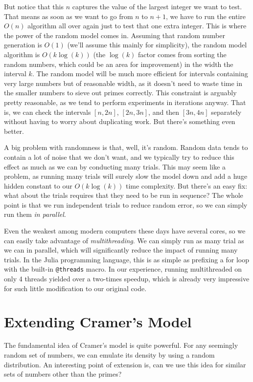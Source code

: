 \documentclass[conference]{IEEEtran}
\begin{document}
But notice that this $n$ captures the value of the largest
integer we want to test. That means as soon as we want
to go from $n$ to $n + 1$, we have to run the entire
$O(n)$ algorithm all over again just to test that one
extra integer. This is where the power of the random
model comes in. Assuming that random number generation
is $O(1)$ (we'll assume this mainly for simplicity),
the random model algorithm is $O(k \log(k))$ (the
$\log(k)$ factor comes from sorting the random numbers,
which could be an area for improvement) in the
width the interval $k$. The random model will be much
more efficient for intervals containing very large
numbers but of reasonable width, as it doesn't need to
waste time in the smaller numbers to sieve out primes
correctly. This constraint is arguably pretty reasonable,
as we tend to perform experiments in iterations anyway.
That is, we can check the intervals $[n, 2n]$, $[2n, 3n]$,
and then $[3n, 4n]$ separately without having to worry
about duplicating work. But there's something even better.

A big problem with randomness is that, well, it's random.
Random data tends to contain a lot of noise that we don't
want, and we typically try to reduce this effect as much
as we can by conducting many trials. This may seem like
a problem, as running many trials will surely slow the
model down and add a huge hidden constant to our
$O(k \log(k))$ time complexity. But there's an easy fix:
what about the trials requires that they need to be run
in sequence? The whole point is that we run independent
trials to reduce random error, so we can simply
run them \textit{in parallel}.

Even the weakest among modern computers these days have
several cores, so we can easily take advantage of
\textit{multithreading}. We can simply run as many trial
as we can in parallel, which will significantly reduce
the impact of running many trials. In the Julia
programming language, this is as simple as
prefixing a for loop with the built-in
\verb|@threads| macro. In our experience, running
multithreaded on only 4 threads yielded over a
two-times speedup, which is already very impressive
for such little modification to our original code.

\section{Extending Cramer's Model}

The fundamental idea of Cramer's model is quite powerful. For any seemingly random set of numbers, we can emulate its density by using a random distribution. An interesting point of extension is, can we use this idea for similar sets of numbers other than the primes?
\end{document}

